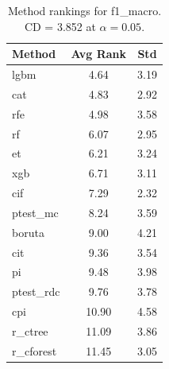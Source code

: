 \begin{table}[h]
\centering
\caption{Method rankings for f1_macro. CD = 3.852 at $\alpha=0.05$.}
\label{tab:ranks_f1_macro}
\begin{tabular}{lcc}
\toprule
Method & Avg Rank & Std \\
\midrule
lgbm & 4.64 & 3.19 \\
cat & 4.83 & 2.92 \\
rfe & 4.98 & 3.58 \\
rf & 6.07 & 2.95 \\
et & 6.21 & 3.24 \\
xgb & 6.71 & 3.11 \\
cif & 7.29 & 2.32 \\
ptest_mc & 8.24 & 3.59 \\
boruta & 9.00 & 4.21 \\
cit & 9.36 & 3.54 \\
pi & 9.48 & 3.98 \\
ptest_rdc & 9.76 & 3.78 \\
cpi & 10.90 & 4.58 \\
r_ctree & 11.09 & 3.86 \\
r_cforest & 11.45 & 3.05 \\
\bottomrule
\end{tabular}
\end{table}